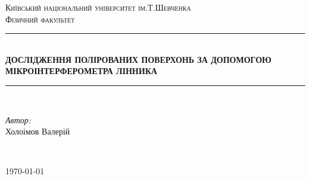 \center
\newcommand{\HRule}{\rule{\linewidth}{0.3 mm}} %
\textsc{\Large Київський національний університет ім.Т.Шевченка }\\[1.5cm] %
\textsc{\Large Фізичний факультет}\\[2.5cm] %


\HRule \\[0.4cm]
{ \huge \bfseries ДОСЛІДЖЕННЯ ПОЛІРОВАНИХ ПОВЕРХОНЬ ЗА ДОПОМОГОЮ МІКРОІНТЕРФЕРОМЕТРА ЛІННИКА
}\\[0.4cm] %
\HRule \\[1.5cm]

\flushright
\begin{minipage}{0.4\textwidth}
\large
\emph{Автор:}\\ Холоімов Валерій %
\end{minipage}\\[12cm]
\center

{\large \today}\\[0cm] %
\flushleft
